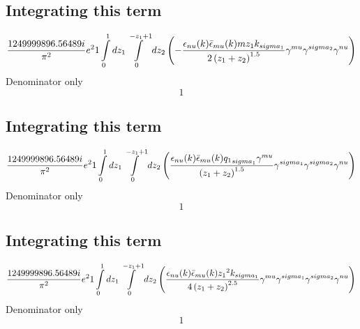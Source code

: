\subsection*{Integrating this term}
\begin{dmath}\frac{1249999896.56489 i}{\pi^{2}} e^{2}1\int\limits_{ 0 }^{ 1 } d{ z_{ 1 } }\int\limits_{ 0 }^{ - { z_{ 1 } } + 1 } d{ z_{ 2 } }\left(- \frac{\epsilon_{ \\nu }({ k }) \bar{\epsilon}_{ \\mu }({ k }) m { z_{ 1 } } { { k }_{ \\sigma_1 } }}{2 \left({ z_{ 1 } } + { z_{ 2 } }\right)^{1.5}} { \gamma^{ \\mu } } { \gamma^{ \\sigma_2 } } { \gamma^{ \\nu } }\right)\end{dmath}
Denominator only
\begin{dmath}1\end{dmath}
\subsection*{Integrating this term}
\begin{dmath}\frac{1249999896.56489 i}{\pi^{2}} e^{2}1\int\limits_{ 0 }^{ 1 } d{ z_{ 1 } }\int\limits_{ 0 }^{ - { z_{ 1 } } + 1 } d{ z_{ 2 } }\left(\frac{\epsilon_{ \\nu }({ k }) \bar{\epsilon}_{ \\mu }({ k }) { { q_1 }_{ \\sigma_1 } } { \gamma^{ \\mu } }}{\left({ z_{ 1 } } + { z_{ 2 } }\right)^{1.5}} { \gamma^{ \\sigma_1 } } { \gamma^{ \\sigma_2 } } { \gamma^{ \\nu } }\right)\end{dmath}
Denominator only
\begin{dmath}1\end{dmath}
\subsection*{Integrating this term}
\begin{dmath}\frac{1249999896.56489 i}{\pi^{2}} e^{2}1\int\limits_{ 0 }^{ 1 } d{ z_{ 1 } }\int\limits_{ 0 }^{ - { z_{ 1 } } + 1 } d{ z_{ 2 } }\left(\frac{\epsilon_{ \\nu }({ k }) \bar{\epsilon}_{ \\mu }({ k }) { z_{ 1 } }^{2} { { k }_{ \\sigma_1 } }}{4 \left({ z_{ 1 } } + { z_{ 2 } }\right)^{2.5}} { \gamma^{ \\mu } } { \gamma^{ \\sigma_1 } } { \gamma^{ \\sigma_2 } } { \gamma^{ \\nu } }\right)\end{dmath}
Denominator only
\begin{dmath}1\end{dmath}
